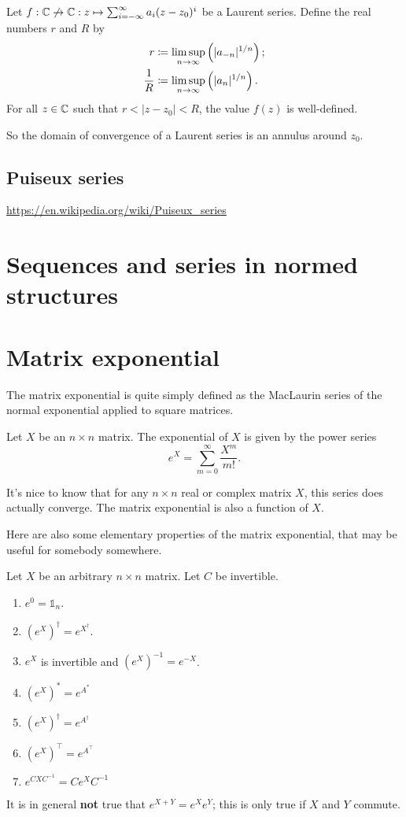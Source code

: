 \begin{proposition} \label{LaurentSeriesConvergence}
Let $f: \mathbb{C}\not\to \mathbb{C}: z\mapsto \sum_{i=-\infty}^\infty a_i(z-z_0)^i$ be a Laurent series. Define the real numbers $r$ and $R$ by
\begin{align*}
r &\coloneqq \limsup_{n\to\infty}\left(|a_{-n}|^{1/n}\right); \\
\frac{1}{R} &\coloneqq \limsup_{n\to\infty}\left(|a_n|^{1/n}\right).
\end{align*}
For all $z\in \mathbb{C}$ such that $r < |z-z_0| < R$, the value $f(z)$ is well-defined.
\end{proposition}
So the domain of convergence of a Laurent series is an annulus around $z_0$.

\subsection{Puiseux series}
\url{https://en.wikipedia.org/wiki/Puiseux_series}

\section{Sequences and series in normed structures}

\section{Matrix exponential}
The matrix exponential is quite simply defined as the MacLaurin series of the normal exponential applied to square matrices.

\begin{definition}
Let $X$ be an $n\times n$ matrix. The exponential of $X$ is given by the power series
\[ e^X = \sum^\infty_{m=0} \frac{X^m}{m!}. \]
\end{definition}

It's nice to know that for any $n \times n$ real or complex matrix $X$, this series does actually converge. The matrix exponential is also a  function of $X$.

Here are also some elementary properties of the matrix exponential, that may be useful for somebody somewhere.
\begin{eigenschap}
Let $X$ be an arbitrary $n\times n$ matrix. Let $C$ be invertible.
\begin{enumerate}
\item $e^0 = \mathbb{1}_n$.
\item $\left(e^X\right)^\dagger = e^{X^\dagger}$.
\item $e^X$ is invertible and $\left(e^X\right)^{-1} = e^{-X}$.
\item $\left(e^X\right)^* = e^{A^*}$
\item $\left(e^X\right)^\dagger = e^{A^\dagger}$
\item $\left(e^X\right)^\intercal = e^{A^\intercal}$
\item $e^{CXC^{-1}} = Ce^XC^{-1}$
\end{enumerate}
\end{eigenschap}
It is in general \textbf{not} true that $e^{X+Y} = e^Xe^Y$; this is only true if $X$ and $Y$ commute.


